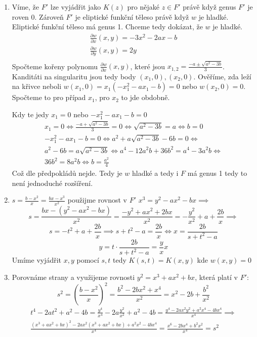 \documentclass[12pt, a4paper]{article}
\begin{document}
\begin{enumerate}[label=(\alph*)]
    \item Víme, že $F'$ lze vyjádřit jako $K(z)$ pro nějaké $z \in F'$ právě když genus $F'$ je roven 0. Zároveň $F'$ je eliptické funkční těleso právě když $w$ je hladké. Eliptické funkční těleso má genus 1. Chceme tedy dokázat, že $w$ je hladké.
    \begin{gather*}
    \frac{\partial w}{\partial x}(x,y) = -3x^2-2ax-b\\
    \frac{\partial w}{\partial y}(x,y) = 2y\\
    \end{gather*}
    Spočteme kořeny polynomu $\frac{\partial w}{\partial x}(x,y)$, které jsou $x_{1,2} = \frac{-a \pm \sqrt{a^2-3b}}{3}$. Kanditáti na singularitu jsou tedy body $(x_1,0), (x_2,0)$. Ověříme, zda leží na křivce neboli $w(x_1,0)=x_1(-x_1^2-ax_1-b)=0$ nebo $w(x_2,0)=0$. Spočteme to pro případ $x_1$, pro $x_2$ to jde obdobně.

    Kdy te jedy $x_1 = 0$ nebo $-x_1^2-ax_1-b=0$
    \begin{gather*}
    x_1 = 0 \iff \frac{-a + \sqrt{a^2-3b}}{3} = 0 \iff \sqrt{a^2-3b} = a \iff b = 0\\
    -x_1^2-ax_1-b=0 \iff a^2 + a\sqrt{a^2 - 3 b}- 6 b = 0 \iff \\
    a^2 - 6 b = a\sqrt{a^2 - 3 b} \iff a^4 - 12 a^2 b + 36 b^2 = a^4 - 3 a^2 b \iff \\
    36 b^2 = 8 a^2 b \iff b = \frac{a^2}{4}
    \end{gather*}
    Což dle předpokládů nejde. Tedy je $w$ hladké a tedy i $F$ má genus 1 tedy to není jednoduché rozšíření.

    \item $s = \frac{b-x^2}{x} = \frac{bx-x^3}{x^2}$ použijme rovnost v $F'$ $x^3=y^2-ax^2-bx \implies$
    \[s = \frac{bx-(y^2-ax^2-bx)}{x^2} = \frac{-y^2+ax^2+2bx}{x^2}=-\frac{y^2}{x^2}+a+\frac{2b}{x} \implies
    \]
    \[
    s = -t^2+a+\frac{2b}{x} \implies s+t^2-a = \frac{2b}{x} \iff x = \frac{2b}{s+t^2-a}
    \]
    \[
    y = t\cdot \frac{2b}{s+t^2-a} = \frac{y}{x} x
    \]
    Umíme vyjádřit $x,y$ pomocí $s,t$ tedy $K(s,t)=K(x,y)$ kde $w(x,y)=0$
    \item Porovnáme strany a využijeme rovnosti $y^2 =x^3+ax^2+bx$, která platí v $F'$:
    \[
    s^2 = \left(\frac{b-x^2}{x}\right)^2 = \frac{b^2-2bx^2+x^4}{x^2} = x^2-2b+\frac{b^2}{x^2}
    \]
    \begin{gather*}
    t^4-2at^2+a^2-4b=\frac{y^4}{x^4}-2a\frac{y^2}{x^2} + a^2-4b = \frac{y^4-2ax^2y^2+a^2x^4-4bx^4}{x^4} \implies\\
    \frac{(x^3+ax^2+bx)^2-2ax^2(x^3+ax^2+bx)+a^2x^2-4bx^4}{x^4} = \frac{x^6-2bx^4+b^2x^2}{x^4} = s^2
    \end{gather*}


\end{enumerate}
\end{document}
